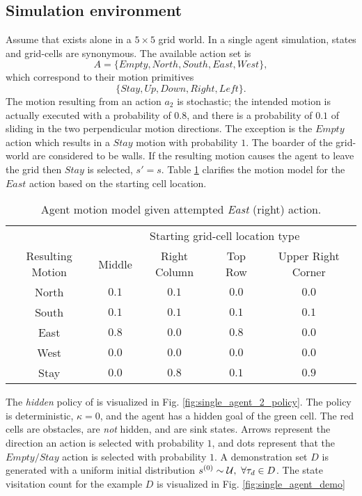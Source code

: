 \subsection{Simulation environment}
    Assume that  exists alone in a $5\times5$ grid world. In a single agent simulation, states and grid-cells
    are synonymous. The available action set is
    \[
    A = \{Empty, North, South, East, West\},
    \]
    which correspond to their motion primitives
    \[
     \{Stay, Up, Down, Right, Left\}.
    \]
    The motion resulting from an action $a_2$ is stochastic; the intended motion is actually executed with a probability
    of $0.8$, and there is a probability of $0.1$ of sliding in the two perpendicular motion directions. The exception
    is the $Empty$ action which results in a $Stay$ motion with probability $1$. The boarder of the grid-world are
    considered to be walls. If the resulting motion causes the agent to leave the grid then $Stay$ is selected, $s'=s$.
    Table \ref{table:motion_model} clarifies the motion model for the $East$ action based on the starting cell location.

    \begin{table}[h!]
    \centering
    \begin{tabular}{ c || c | c | c | c}
              & \multicolumn{4}{c}{Starting grid-cell location type}\\
        Resulting Motion & Middle & Right Column & Top Row & Upper Right Corner\\
        \hline
        North & $0.1$ & $0.1$ & $0.0$ & $0.0$ \\
        South & $0.1$ & $0.1$ & $0.1$ & $0.1$ \\
        East  & $0.8$ & $0.0$ & $0.8$ & $0.0$ \\
        West  & $0.0$ & $0.0$ & $0.0$ & $0.0$ \\
        Stay  & $0.0$ & $0.8$ & $0.1$ & $0.9$ \\
    \end{tabular}
    \label{table:motion_model}
    \caption{Agent motion model given attempted \textit{East} (right) action.}
    \end{table}

    The \textit{hidden} policy of  is visualized in Fig. \ref{fig:single_agent_2_policy}. The policy is
    deterministic, $\kappa=0$, and the agent has a hidden goal of the green cell. The red cells are obstacles, are
    \textit{not} hidden, and are sink states. Arrows represent the direction an action is selected with probability $1$,
    and dots represent that the $Empty/Stay$ action is selected with probability $1$. A demonstration set $D$ is
    generated with a uniform initial distribution $s^{(0)} \sim \mathcal{U},\ \forall \tau_d \in D$. The state
    visitation count for the example $D$ is visualized in Fig. \ref{fig:single_agent_demo}

